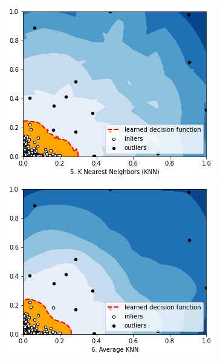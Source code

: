 \documentclass[12pt,twoside]{report}
\begin{document}
\begin{figure}[H]
\begin{multicols}{2}
    \includegraphics[width=\linewidth]{../code/figures/knn.png}\par 
    \includegraphics[width=\linewidth]{../code/figures/average_knn.png}\par 
\end{multicols}
\label{fig:knn-average_knn}
\end{figure}
\end{document}
